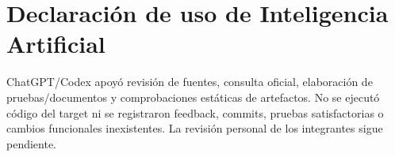 \documentclass[11pt,a4paper]{article}
\begin{document}
\section{Declaración de uso de Inteligencia
Artificial}\label{APE4-semana-4-declaraciuxf3n-de-uso-de-inteligencia-artificial}

ChatGPT/Codex apoyó revisión de fuentes, consulta oficial, elaboración
de pruebas/documentos y comprobaciones estáticas de artefactos. No se
ejecutó código del target ni se registraron feedback, commits, pruebas
satisfactorias o cambios funcionales inexistentes. La revisión personal
de los integrantes sigue pendiente.
\end{document}
